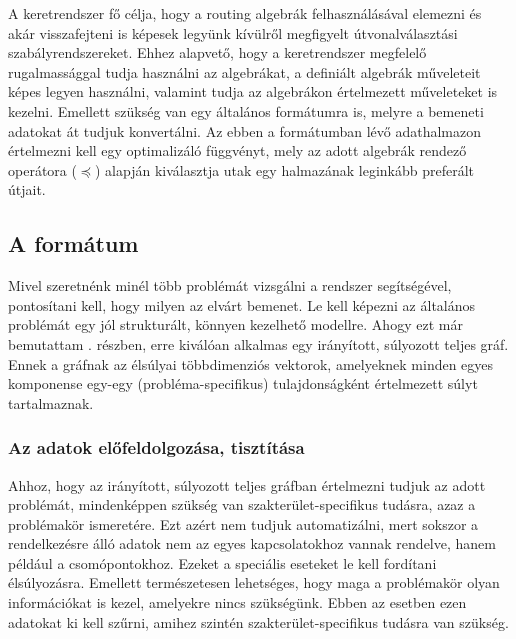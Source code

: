   A keretrendszer fő célja, hogy a routing algebrák felhasználásával elemezni és akár visszafejteni is képesek legyünk kívülről megfigyelt útvonalválasztási szabályrendszereket. Ehhez alapvető, hogy a keretrendszer megfelelő rugalmassággal tudja használni az algebrákat, a definiált algebrák műveleteit képes legyen használni, valamint tudja az algebrákon értelmezett műveleteket is kezelni. Emellett szükség van egy általános formátumra is, melyre a bemeneti adatokat át tudjuk konvertálni. Az ebben a formátumban lévő adathalmazon értelmezni kell egy optimalizáló függvényt, mely az adott algebrák rendező operátora ($\preceq$) alapján kiválasztja utak egy halmazának leginkább preferált útjait.

    \subsection{A formátum}
    Mivel szeretnénk minél több problémát vizsgálni a rendszer segítségével, pontosítani kell, hogy milyen az elvárt bemenet. Le kell képezni az általános problémát egy jól strukturált, könnyen kezelhető modellre. Ahogy ezt már bemutattam . részben, erre kiválóan alkalmas egy irányított, súlyozott teljes gráf. Ennek a gráfnak az élsúlyai többdimenziós vektorok, amelyeknek minden egyes komponense egy-egy (probléma-specifikus) tulajdonságként értelmezett súlyt tartalmaznak.

      \subsubsection{Az adatok előfeldolgozása, tisztítása}\label{prep}
      Ahhoz, hogy az irányított, súlyozott teljes gráfban értelmezni tudjuk az adott problémát, mindenképpen szükség van szakterület-specifikus tudásra, azaz a problémakör ismeretére. Ezt azért nem tudjuk automatizálni, mert sokszor a rendelkezésre álló adatok nem az egyes kapcsolatokhoz vannak rendelve, hanem például a csomópontokhoz. Ezeket a speciális eseteket le kell fordítani élsúlyozásra. Emellett természetesen lehetséges, hogy maga a problémakör olyan információkat is kezel, amelyekre nincs szükségünk. Ebben az esetben ezen adatokat ki kell szűrni, amihez szintén szakterület-specifikus tudásra van szükség.\\

